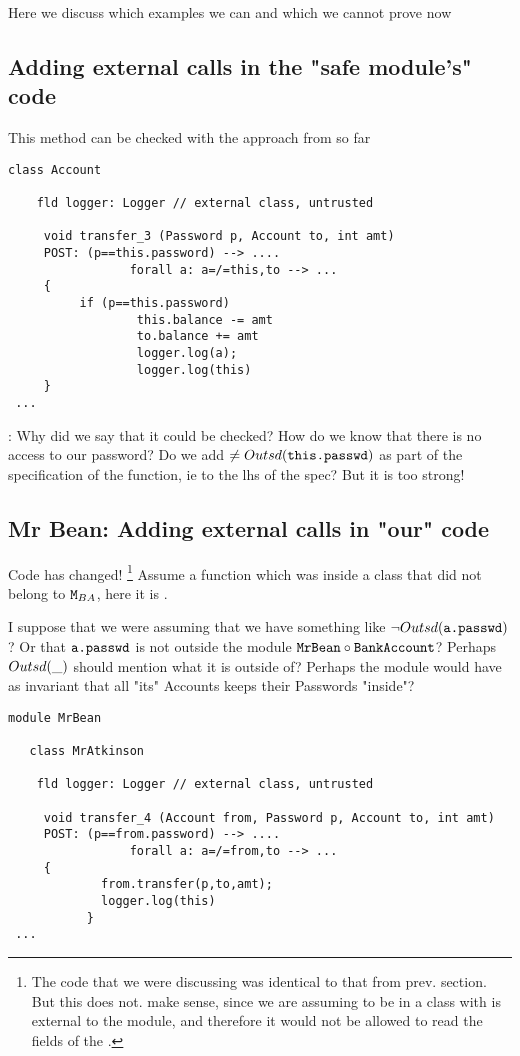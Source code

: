 Here we discuss which examples we can and which we cannot prove now

\subsection{Adding external calls in the "safe module's" code}

This method  can be checked with the approach from so far

\begin{lstlisting}[language=chainmail, mathescape=true, frame=lines]
class Account

    fld logger: Logger // external class, untrusted

     void transfer_3 (Password p, Account to, int amt) 
     POST: (p==this.password) --> ....
                 forall a: a=/=this,to --> ...
     {
          if (p==this.password) 
                  this.balance -= amt
                  to.balance += amt
                  logger.log(a);
                  logger.log(this)
     }
 ...
\end{lstlisting}

\SP: Why did we say that it could be checked? How do we know that there is no access to our password? Do we add $\neq Outsd({\texttt{this.passwd}})$ 
as part of the specification of the function, ie to the lhs of the spec? But it is too strong!

\subsection{Mr Bean: Adding external calls in "our" code}

\SP Code has changed!
\footnote{
 The code that we were discussing was identical to that from prev. section. But this does not. make sense, since we are
 assuming to be in a class with is external to the  module, and therefore it would not be allowed to read the fields of the .
}
Assume a function  which was inside a class that did not belong to ${\texttt{M}}{_{BA}}$, here it is  . 

\SP I suppose that we were assuming that we have something like  $\neg Outsd({\texttt{a.passwd}})$? Or that ${{\texttt{a.passwd}}}$ is not outside the module 
${\texttt{MrBean}}\circ{\texttt{BankAccount}}$? Perhaps $Outsd(\_)$ should mention what it is outside of? Perhaps the module  would have as invariant that all "its" Accounts keeps their Passwords "inside"?


\begin{lstlisting}[language=chainmail, mathescape=true, frame=lines]
module MrBean

   class MrAtkinson

    fld logger: Logger // external class, untrusted

     void transfer_4 (Account from, Password p, Account to, int amt) 
     POST: (p==from.password) --> ....
                 forall a: a=/=from,to --> ...
     {
             from.transfer(p,to,amt);
             logger.log(this)
           }
 ...
\end{lstlisting}



